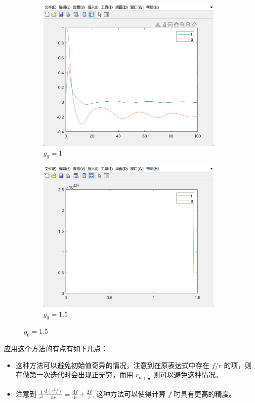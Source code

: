 \documentclass[11pt]{ctexart}
\begin{document}
\begin{figure}[H]
        \begin{subfigure}[h]{0.4\textwidth}
            \includegraphics[width=\textwidth]{picture/exp3_1_3}
            \caption{\(g_0=1\)}
        \end{subfigure}
        \begin{subfigure}[h]{0.4\textwidth}
            \includegraphics[width=\textwidth]{picture/exp3_1_4}
            \caption{\(g_0=1.5\)}
        \end{subfigure}
        \label{fig:}
    \end{figure}

    应用这个方法的有点有如下几点：
    \begin{itemize}
        \item 这种方法可以避免初始值奇异的情况，注意到在原表达式中存在 \(f/r\) 的项，则在做第一次迭代时会出现正无穷，而用
        \(r_{n+\frac{1}{2}}\) 则可以避免这种情况。
        \item 注意到 \(\frac{1}{r^2}\frac{\text{d}(r^2 f)}{\text{d}r}=
        \frac{\text{d}f}{\text{d}r}+\frac{2f}{r}\), 这种方法可以使得计算 \(f\) 时具有更高的精度。
    \end{itemize}
\end{document}
